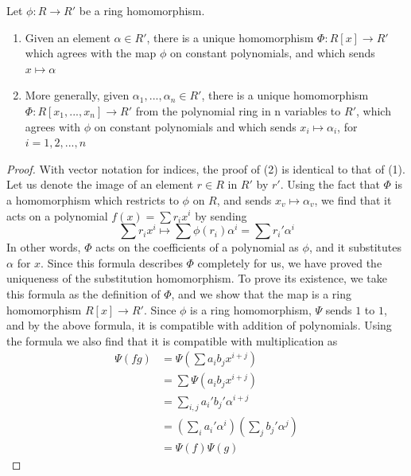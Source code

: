 \documentclass[12pt, a4paper, oneside, openright, titlepage]{book}
\begin{document}
\begin{namthm}
        Let $\phi:R\rightarrow R'$ be a ring homomorphism. \begin{enumerate}
                \item Given an element $\alpha \in R'$, there is a unique homomorphism $\Phi: R[x] \rightarrow R'$ which agrees with the map $\phi$ on constant polynomials, and which sends $x \mapsto \alpha$
                \item More generally, given $\alpha_1,...,\alpha_n \in R'$, there is a unique homomorphism $\Phi: R[x_1,...,x_n] \rightarrow R'$ from the polynomial ring in n variables to $R'$, which agrees with $\phi$ on constant polynomials and which sends $x_i\mapsto \alpha_i$, for $i=1,2,...,n$
        \end{enumerate}
\end{namthm}
\begin{proof}
        With vector notation for indices, the proof of (2) is identical to that of (1). Let us denote the image of an element $r \in R$ in $R'$ by $r'$. Using the fact that $\Phi$ is a homomorphism which restricts to $\phi$ on $R$, and sends $x_v \mapsto \alpha_v$, we find that it acts on a polynomial $f(x) = \sum r_ix^i$ by sending \begin{equation}
                \sum r_ix^i \mapsto \sum\phi(r_i)\alpha^i = \sum r_i'\alpha^i
        \end{equation}
        In other words, $\Phi$ acts on the coefficients of a polynomial as $\phi$, and it substitutes $\alpha$ for $x$. Since this formula describes $\Phi$ completely for us, we have proved the uniqueness of the substitution homomorphism. To prove its existence, we take this formula as the definition of $\Phi$, and we show that the map is a ring homomorphism $R[x] \rightarrow R'$. Since $\phi$ is a ring homomorphism, $\Psi$ sends $1$ to $1$, and by the above formula, it is compatible with addition of polynomials. Using the formula we also find that it is compatible with multiplication as \begin{align*}
                \Psi(fg) &= \Psi\left(\sum a_ib_jx^{i+j}\right) \\
                &= \sum \Psi(a_ib_jx^{i+j})\\
                &= \sum\limits_{i,j} a_i'b_j'\alpha^{i+j}\\
                &= \left(\sum\limits_ia_i'\alpha^i\right)\left(\sum\limits_jb_j'\alpha^j\right) \\
                &=\Psi(f)\Psi(g)
        \end{align*}
\end{proof}
\end{document}
